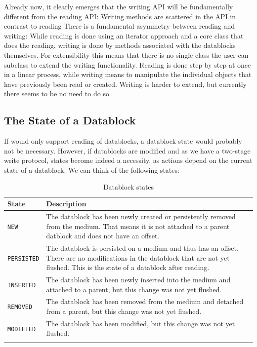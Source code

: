 Already now, it clearly emerges that the writing API will be fundamentally different from the reading API:
{%
Writing methods are scattered in the API in contrast to reading
}
{%
There is a fundamental asymmetry between reading and writing: While reading is done using an iterator approach and a core class that does the reading, writing is done by methods associated with the datablocks themselves. For extensibility this means that there is no single class the user can subclass to extend the writing functionality.
}
{%
Reading is done step by step at once in a linear process, while writing means to manipulate the individual objects that have previously been read or created.
}
{%
Writing is harder to extend, but currently there seems to be no need to do so
}

\subsection{The State of a Datablock}%
\label{sec:StatesofDatablocks}%

If \LibName{} would only support reading of datablocks, a datablock state would probably not be necessary. However, if datablocks are modified and as we have a two-stage write protocol, states become indeed a necessity, as actions depend on the current state of a datablock. We can think of the following states:
\begin{longtable}{|p{}|p{}|} \hline
  \textbf{State} & \textbf{Description} \\ \endhead \hline
  \texttt{NEW} & The datablock has been newly created or persistently removed from the medium. That means it is not attached to a parent datblock and does not have an offset. \\
  \hline
  \texttt{PERSISTED} & The datablock is persisted on a medium and thus has an offset. There are no modifications in the datablock that are not yet flushed. This is the state of a datablock after reading. \\
  \hline
  \texttt{INSERTED} & The datablock has been newly inserted into the medium and attached to a parent, but this change was not yet flushed. \\
  \hline
  \texttt{REMOVED} & The datablock has been removed from the medium and detached from a parent, but this change was not yet flushed. \\
  \hline
  \texttt{MODIFIED} & The datablock has been modified, but this change was not yet flushed. \\
  \hline
  \caption{Datablock states}
  \label{tab:Datablockstates}
\end{longtable}

